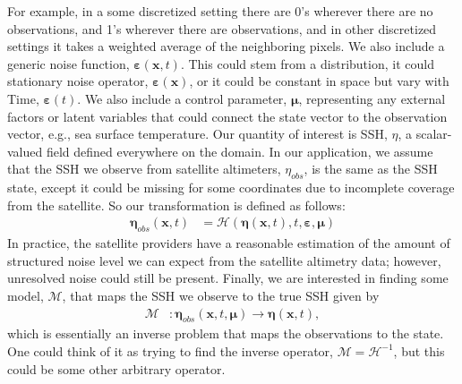 For example, in a some discretized setting there are 0's wherever there are no observations, and 1's wherever there are observations, and in other discretized settings it takes a weighted average of the neighboring pixels.
We also include a generic noise function, $\boldsymbol{\varepsilon}(\mathbf{x},t)$.
This could stem from a distribution, it could stationary noise operator, $\boldsymbol{\varepsilon}(\mathbf{x})$, or it could be constant in space but vary with Time, $\boldsymbol{\varepsilon}(t)$. 
We also include a control parameter, $\boldsymbol{\mu}$, representing any external factors or latent variables that could connect the state vector to the observation vector, e.g., sea surface temperature.
%
%
%
Our quantity of interest is SSH, $\eta$, a scalar-valued field defined everywhere on the domain. In our application, we assume that the SSH we observe from satellite altimeters, $\eta_{obs}$, is the same as the SSH state, except it could be missing for some coordinates due to incomplete coverage from the satellite. So our transformation is defined as follows:
\begin{align} \label{eq:ssh_field_continuous}
\boldsymbol{\eta}_{obs}(\mathbf{x},t) &= \mathcal{H}\left(\boldsymbol{\eta}(\mathbf{x},t), t, \boldsymbol{\varepsilon}, \boldsymbol{\mu}\right)
\end{align}
In practice, the satellite providers have a reasonable estimation of the amount of structured noise level we can expect from the satellite altimetry data; however, unresolved noise could still be present. 
Finally, we are interested in finding some model, $\mathcal{M}$, that maps the SSH we observe to the true SSH given by
\begin{align} \label{eq:interp_problem}
    \mathcal{M} &: \boldsymbol{\eta}_{obs}(\mathbf{x}, t, \boldsymbol{\mu}) \rightarrow \boldsymbol{\eta}(\mathbf{x},t),
\end{align}
which is essentially an inverse problem that maps the observations to the state.
One could think of it as trying to find the inverse operator, $\mathcal{M}=\mathcal{H}^{-1}$, but this could be some other arbitrary operator.  
%
